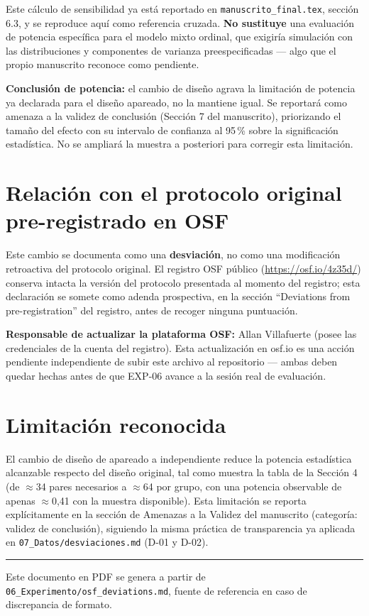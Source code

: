 \documentclass[11pt,a4paper]{article}
\begin{document}
Este cálculo de sensibilidad ya está reportado en \texttt{manuscrito\_final.tex},
sección 6.3, y se reproduce aquí como referencia cruzada. \textbf{No
sustituye} una evaluación de potencia específica para el modelo mixto
ordinal, que exigiría simulación con las distribuciones y componentes de
varianza preespecificadas --- algo que el propio manuscrito reconoce como
pendiente.

\textbf{Conclusión de potencia:} el cambio de diseño agrava la limitación
de potencia ya declarada para el diseño apareado, no la mantiene igual. Se
reportará como amenaza a la validez de conclusión (Sección 7 del
manuscrito), priorizando el tamaño del efecto con su intervalo de confianza
al 95\,\% sobre la significación estadística. No se ampliará la muestra a
posteriori para corregir esta limitación.

\section{Relación con el protocolo original pre-registrado en OSF}

Este cambio se documenta como una \textbf{desviación}, no como una
modificación retroactiva del protocolo original. El registro OSF público
(\url{https://osf.io/4z35d/}) conserva intacta la versión del protocolo
presentada al momento del registro; esta declaración se somete como adenda
prospectiva, en la sección ``Deviations from pre-registration'' del
registro, antes de recoger ninguna puntuación.

\textbf{Responsable de actualizar la plataforma OSF:} Allan Villafuerte
(posee las credenciales de la cuenta del registro). Esta actualización en
osf.io es una acción pendiente independiente de subir este archivo al
repositorio --- ambas deben quedar hechas antes de que EXP-06 avance a la
sesión real de evaluación.

\section{Limitación reconocida}

El cambio de diseño de apareado a independiente reduce la potencia
estadística alcanzable respecto del diseño original, tal como muestra la
tabla de la Sección 4 (de $\approx$34 pares necesarios a $\approx$64 por
grupo, con una potencia observable de apenas $\approx$0,41 con la muestra
disponible). Esta limitación se reporta explícitamente en la sección de
Amenazas a la Validez del manuscrito (categoría: validez de conclusión),
siguiendo la misma práctica de transparencia ya aplicada en
\texttt{07\_Datos/desviaciones.md} (D-01 y D-02).

\vfill
\hrule
\vspace{0.2cm}
{\small Este documento en PDF se genera a partir de
\texttt{06\_Experimento/osf\_deviations.md}, fuente de referencia en caso de
discrepancia de formato.\par}
\end{document}
